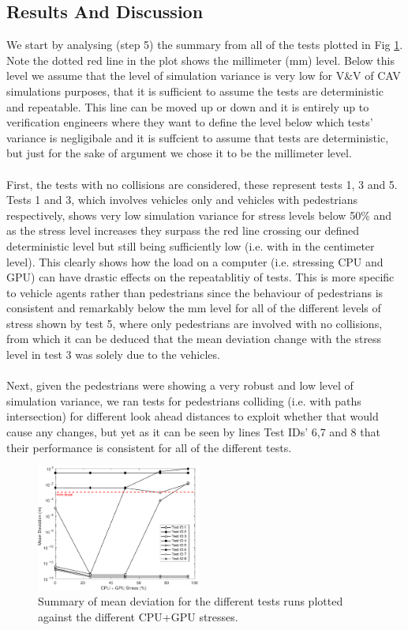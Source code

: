 \subsection{Results And Discussion}
\noindent We start by analysing (step 5) the summary from all of the tests plotted in Fig \ref{ExperimentsStressSummary}. 
Note the dotted red line in the plot shows the millimeter (mm) level. 
Below this level we assume that the level of simulation variance is very low for V\&V of CAV simulations purposes, that it is sufficient to assume the tests are deterministic and repeatable. 
This line can be moved up or down and it is entirely up to verification engineers where they want to define the level below which tests' variance is negligibale and it is suffcient to assume that tests are deterministic, but just for the sake of argument we chose it to be the millimeter level.\\\\
First, the tests with no collisions are considered, these represent tests 1, 3 and 5.
Tests 1 and 3, which involves vehicles only and vehicles with pedestrians respectively, shows very low simulation variance for stress levels below 50\% and as the stress level increases they surpass the red line crossing our defined deterministic level but still being sufficiently low (i.e. with in the centimeter level). This clearly shows how the load on a computer (i.e. stressing CPU and GPU) can have drastic effects on the repeatablitiy of tests.
This is more specific to vehicle agents rather than pedestrians since the behaviour of pedestrians is consistent and remarkably below the mm level for all of the different levels of stress shown by test 5, where only pedestrians are involved with no collisions, from which it can be deduced that the mean deviation change with the stress level in test 3 was solely due to the vehicles. \\\\
Next, given the pedestrians were showing a very robust and low level of simulation variance, we ran tests for pedestrians colliding (i.e. with paths intersection) for different look ahead distances to exploit whether that would cause any changes, but yet as it can be seen by lines Test IDs' 6,7 and 8 that their performance is consistent for all of the different tests.

\begin{figure}[h]
    \centering
    \includegraphics[width=0.48\textwidth]{Other/Figures/ExperimentsStressSummary.pdf}
    \caption{Summary of mean deviation for the different tests runs plotted against the different CPU+GPU stresses.}

    \label{ExperimentsStressSummary}
\end{figure}

